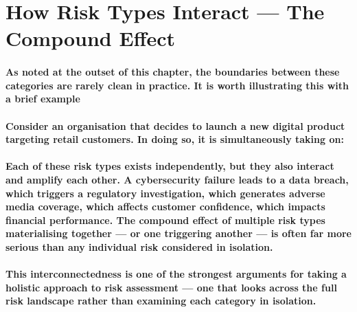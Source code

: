 \section{How Risk Types Interact — The Compound Effect}
\paragraph{As noted at the outset of this chapter, the boundaries between these categories are rarely clean in practice. It is worth illustrating this with a brief example}
\paragraph{Consider an organisation that decides to launch a new digital product targeting retail customers. In doing so, it is simultaneously taking on:}
\begin{itemize}
\end{itemize}
\paragraph{Each of these risk types exists independently, but they also interact and amplify each other. A cybersecurity failure leads to a data breach, which triggers a regulatory investigation, which generates adverse media coverage, which affects customer confidence, which impacts financial performance. The compound effect of multiple risk types materialising together — or one triggering another — is often far more serious than any individual risk considered in isolation.}
\paragraph{This interconnectedness is one of the strongest arguments for taking a holistic approach to risk assessment — one that looks across the full risk landscape rather than examining each category in isolation.}

